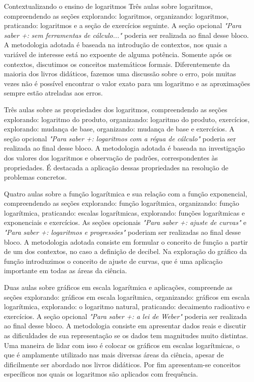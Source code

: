 \begin{apresentacao}{Contextualizando o ensino de logaritmos}
Três aulas sobre logaritmos, compreendendo as seções explorando: logaritmos, organizando: logaritmos, praticando: logaritmos e a seção de exercícios seguinte. A seção opcional \textit{"Para saber +: sem ferramentas de cálculo..."} poderia ser realizada ao final desse bloco. A metodologia adotada é baseada na introdução de contextos, nos quais a variável de interesse está no expoente de alguma potência. Somente após os contextos, discutimos os conceitos matemáticos formais. Diferentemente da maioria dos livros didáticos, fazemos uma discussão sobre o erro, pois muitas vezes não é possível encontrar o valor exato para um logaritmo e as aproximações sempre estão atreladas aos erros.

Três aulas sobre as propriedades dos logaritmos, compreendendo as seções explorando: logaritmo do produto, organizando: logaritmo do produto, exercícios, explorando: mudança de base, organizando: mudança de base e exercícios. A seção opcional \textit{"Para saber +: logaritmos com a régua de cálculo"} poderia ser realizada ao final desse bloco. A metodologia adotada é baseada na investigação dos valores dos logaritmos e observação de padrões, correspondentes às propriedades. É destacada a aplicação dessas propriedades na resolução de problemas concretos.

Quatro aulas sobre a função logarítmica e sua relação com a função exponencial, compreendendo as seções explorando: função logarítmica, organizando: função logarítmica, praticando: escalas logarítmicas, explorando: funções logarítmicas e exponenciais e exercícios. As seções opcionais \textit{"Para saber +: ajuste de curvas"} e \textit{"Para saber +: logaritmos e progressões"} poderiam ser realizadas ao final desse bloco. A metodologia adotada consiste em formular o conceito de função a partir de um dos contextos, no caso a definição de decibel. Na exploração do gráfico da função introduzimos o conceito de ajuste de curvas, que é uma aplicação importante em todas as áreas da ciência.

Duas aulas sobre gráficos em escala logarítmica e aplicações, compreende as seções explorando: gráficos em escala logarítmica, organizando: gráficos em escala logarítmica, explorando: o logaritmo natural, praticando: decaimento radioativo e exercícios. A seção opcional \textit{"Para saber +: a lei de Weber"} poderia ser realizada ao final desse bloco. A metodologia consiste em apresentar dados reais e discutir as dificuldades de sua representação se os dados tem magnitudes muito distintas. Uma maneira de lidar com isso é colocar os gráficos em escalas logarítmicas, o que é amplamente utilizado nas mais diversas áreas da ciência, apesar de dificilmente ser abordado nos livros didáticos. Por fim apresentam-se conceitos específicos nos quais os logaritmos são aplicados com frequência.



\end{apresentacao}
